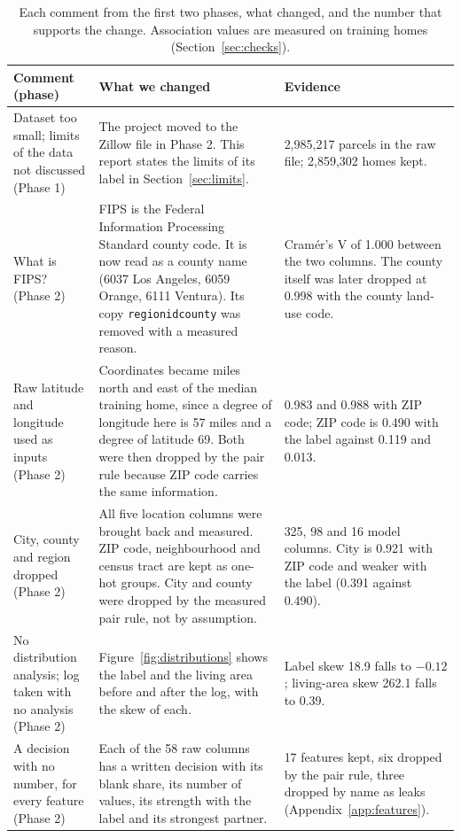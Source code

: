 \documentclass[sigconf,nonacm,10pt]{acmart}
\begin{document}
\begin{table}[t]
\caption{Each comment from the first two phases, what changed, and the number that supports the change. Association values are measured on training homes (Section~\ref{sec:checks}).}
\label{tab:feedback}
\small
\renewcommand{\arraystretch}{1.2}
\begin{tabularx}{\textwidth}{@{}L{3.6cm}YY@{}}
\toprule
Comment (phase) & What we changed & Evidence \\
\midrule
Dataset too small; limits of the data not discussed (Phase 1) & The project moved to the Zillow file in Phase 2. This report states the limits of its label in Section~\ref{sec:limits}. & 2,985,217 parcels in the raw file; 2,859,302 homes kept. \\
What is FIPS? (Phase 2) & FIPS is the Federal Information Processing Standard county code. It is now read as a county name (6037 Los Angeles, 6059 Orange, 6111 Ventura). Its copy \texttt{regionidcounty} was removed with a measured reason. & Cram\'er's V of 1.000 between the two columns. The county itself was later dropped at 0.998 with the county land-use code. \\
Raw latitude and longitude used as inputs (Phase 2) & Coordinates became miles north and east of the median training home, since a degree of longitude here is 57 miles and a degree of latitude 69. Both were then dropped by the pair rule because ZIP code carries the same information. & 0.983 and 0.988 with ZIP code; ZIP code is 0.490 with the label against 0.119 and 0.013. \\
City, county and region dropped (Phase 2) & All five location columns were brought back and measured. ZIP code, neighbourhood and census tract are kept as one-hot groups. City and county were dropped by the measured pair rule, not by assumption. & 325, 98 and 16 model columns. City is 0.921 with ZIP code and weaker with the label (0.391 against 0.490). \\
No distribution analysis; log taken with no analysis (Phase 2) & Figure~\ref{fig:distributions} shows the label and the living area before and after the log, with the skew of each. & Label skew 18.9 falls to $-0.12$; living-area skew 262.1 falls to 0.39. \\
A decision with no number, for every feature (Phase 2) & Each of the 58 raw columns has a written decision with its blank share, its number of values, its strength with the label and its strongest partner. & 17 features kept, six dropped by the pair rule, three dropped by name as leaks (Appendix~\ref{app:features}). \\

\end{tabularx}
\end{table}
\end{document}

